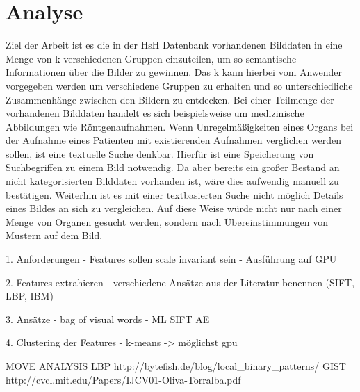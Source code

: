 \chapter{Analyse}

Ziel der Arbeit ist es die in der HsH Datenbank vorhandenen Bilddaten in eine Menge von k verschiedenen Gruppen einzuteilen, um so semantische Informationen über die Bilder zu gewinnen. Das k kann hierbei vom Anwender vorgegeben werden um verschiedene Gruppen zu erhalten und so unterschiedliche Zusammenhänge zwischen den Bildern zu entdecken. Bei einer Teilmenge der vorhandenen Bilddaten handelt es sich beispielsweise um medizinische Abbildungen wie Röntgenaufnahmen. Wenn Unregelmäßigkeiten eines Organs bei der Aufnahme eines Patienten mit existierenden Aufnahmen verglichen werden sollen, ist eine textuelle Suche denkbar. Hierfür ist eine Speicherung von Suchbegriffen zu einem Bild notwendig. Da aber bereits ein großer Bestand an nicht kategorisierten Bilddaten vorhanden ist, wäre dies aufwendig manuell zu bestätigen. Weiterhin ist es mit einer textbasierten Suche nicht möglich Details eines Bildes an sich zu vergleichen. Auf diese Weise würde nicht nur nach einer Menge von Organen gesucht werden, sondern nach Übereinstimmungen von Mustern auf dem Bild.

1. Anforderungen 
	- Features sollen scale invariant sein
	- Ausführung auf GPU

2. Features extrahieren 
	- verschiedene Ansätze aus der Literatur benennen (SIFT, LBP, IBM)
	
3. Ansätze
	- bag of visual words
	- ML SIFT AE

4. Clustering der Features
	- k-means -> möglichst gpu
	
	
MOVE ANALYSIS
LBP http://bytefish.de/blog/local\_binary\_patterns/
GIST http://cvcl.mit.edu/Papers/IJCV01-Oliva-Torralba.pdf